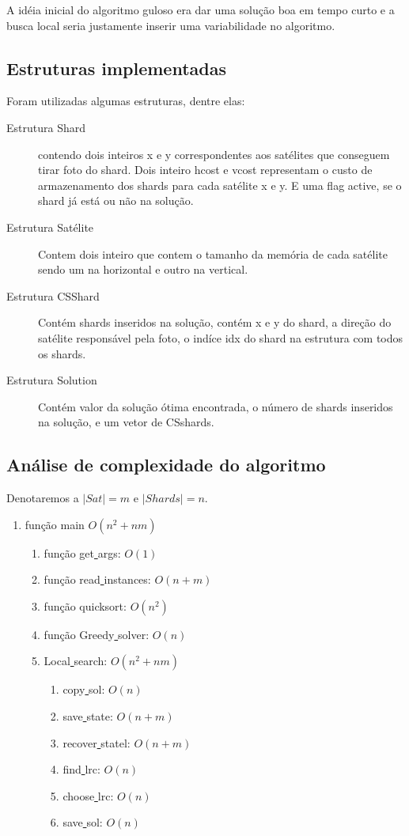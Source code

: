 \documentclass[11pt,letterpaper]{article}
\begin{document}
A idéia inicial do algoritmo guloso era dar uma solução boa em tempo
curto e a busca local seria justamente inserir uma variabilidade no algoritmo.

\subsection{Estruturas implementadas}
Foram utilizadas algumas estruturas, dentre elas:
\begin{description}
\item[Estrutura Shard] contendo dois inteiros x e y correspondentes aos
  satélites que conseguem tirar foto do shard. Dois inteiro hcost e
  vcost representam o custo de armazenamento dos shards para cada
  satélite x e y. E uma flag active, se o shard já está ou não na
  solução.
\item[Estrutura Satélite] Contem dois inteiro que contem o tamanho da
  memória de cada satélite sendo um na horizontal e outro na vertical.
\item[Estrutura CSShard] Contém shards inseridos na solução, contém x
  e y do shard, a direção do satélite responsável pela foto, o indíce
  idx do shard na estrutura com todos os shards.
\item[Estrutura Solution] Contém valor da solução ótima encontrada, o
  número de shards inseridos na solução, e um vetor de CSshards.

\end{description}


\subsection{Análise de complexidade do algoritmo}
Denotaremos a $|Sat|= m $ e $|Shards|= n $. 

\begin{enumerate}
\item função main $O(n^2+nm)$
  \begin{enumerate}
  \item função get\underline{ }args: $O(1)$
  \item função read\underline{ }instances: $O(n+m)$
  \item função quicksort: $O(n^2)$ 
  \item função Greedy\underline{ }solver: $O(n)$
  \item  Local\underline{ }search: $O(n^2+nm)$
    \begin{enumerate}
    \item copy\underline{ }sol: $O(n)$
    \item save\underline{ }state: $O(n+m)$
    \item recover\underline{ }statel: $O(n+m)$
    \item find\underline{ }lrc: $O(n)$
    \item choose\underline{ }lrc: $O(n)$
    \item save\underline{ }sol: $O(n)$ 
    \end{enumerate}
  \end{enumerate}
\end{enumerate}
\end{document}
